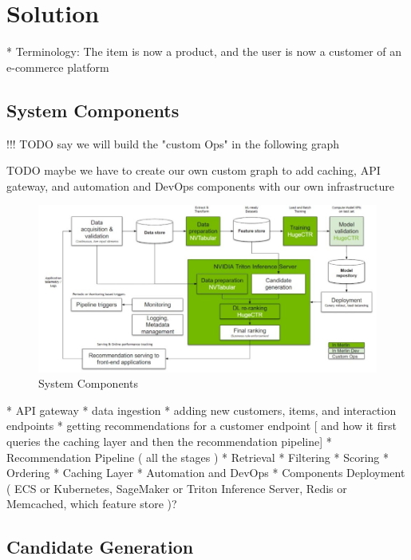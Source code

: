 \chapter{Solution}
\minitoc


* Terminology: The item is now a product, and the user is now a customer of an e-commerce platform

\section{System Components}


!!! TODO say we will build the "custom Ops" in the following graph

TODO maybe we have to create our own custom graph to add caching, API gateway, and automation and DevOps components with our own infrastructure 

\begin{figure}[H]
    \centering
    \includegraphics[width=1\textwidth]{assets/components.jpeg}
    \caption{System Components\cite{NvidiaRecSysBestPractices}}
\end{figure}



* API gateway
    * data ingestion
    * adding new customers, items, and interaction endpoints 
    * getting recommendations for a customer endpoint [ and how it first queries the caching layer and then the recommendation pipeline]
* Recommendation Pipeline ( all the stages )
    * Retrieval
    * Filtering
    * Scoring
    * Ordering
* Caching Layer
* Automation and DevOps
* Components Deployment ( ECS or Kubernetes, SageMaker or Triton Inference Server, Redis or Memcached, which feature store )?



\section{Candidate Generation}




